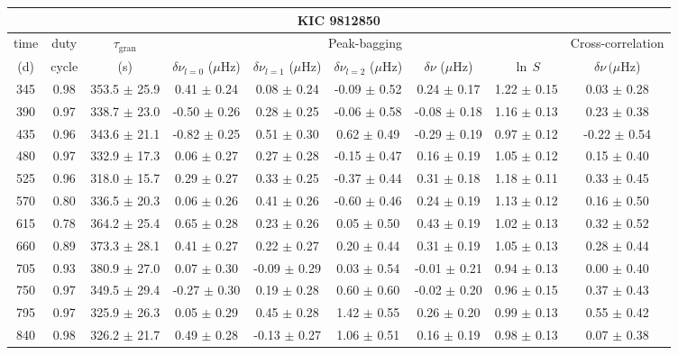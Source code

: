 \documentclass[twocolumn]{aastex61}%
\begin{document}
\begin{table*}[ht]\centering\fontsize{9.}{7.}\selectfont
\begin{tabular}{ccc|ccccc|c}
\multicolumn{9}{c}{KIC 9812850}\\ \hline\hline
time & duty & $\tau_\text{gran}$ &\multicolumn{5}{c|}{Peak-bagging}&Cross-correlation\\
(d)& cycle & (s)&$\delta\nu_{l=0}$ ($\mu$Hz) & $\delta\nu_{l=1}$ ($\mu$Hz) & $\delta\nu_{l=2}$ ($\mu$Hz) & $\delta\nu$ ($\mu$Hz)& $\ln\,S$ & $\delta\nu\,(\mu$Hz)\\\hline
345 & 0.98 & 353.5 $\pm$ 25.9 & 0.41 $\pm$ 0.24 & 0.08 $\pm$ 0.24 & -0.09 $\pm$ 0.52 & 0.24 $\pm$ 0.17 & 1.22 $\pm$ 0.15 & 0.03 $\pm$ 0.28\\
390 & 0.97 & 338.7 $\pm$ 23.0 & -0.50 $\pm$ 0.26 & 0.28 $\pm$ 0.25 & -0.06 $\pm$ 0.58 & -0.08 $\pm$ 0.18 & 1.16 $\pm$ 0.13 & 0.23 $\pm$ 0.38\\
435 & 0.96 & 343.6 $\pm$ 21.1 & -0.82 $\pm$ 0.25 & 0.51 $\pm$ 0.30 & 0.62 $\pm$ 0.49 & -0.29 $\pm$ 0.19 & 0.97 $\pm$ 0.12 & -0.22 $\pm$ 0.54\\
480 & 0.97 & 332.9 $\pm$ 17.3 & 0.06 $\pm$ 0.27 & 0.27 $\pm$ 0.28 & -0.15 $\pm$ 0.47 & 0.16 $\pm$ 0.19 & 1.05 $\pm$ 0.12 & 0.15 $\pm$ 0.40\\
525 & 0.96 & 318.0 $\pm$ 15.7 & 0.29 $\pm$ 0.27 & 0.33 $\pm$ 0.25 & -0.37 $\pm$ 0.44 & 0.31 $\pm$ 0.18 & 1.18 $\pm$ 0.11 & 0.33 $\pm$ 0.45\\
570 & 0.80 & 336.5 $\pm$ 20.3 & 0.06 $\pm$ 0.26 & 0.41 $\pm$ 0.26 & -0.60 $\pm$ 0.46 & 0.24 $\pm$ 0.19 & 1.13 $\pm$ 0.12 & 0.16 $\pm$ 0.50\\
615 & 0.78 & 364.2 $\pm$ 25.4 & 0.65 $\pm$ 0.28 & 0.23 $\pm$ 0.26 & 0.05 $\pm$ 0.50 & 0.43 $\pm$ 0.19 & 1.02 $\pm$ 0.13 & 0.32 $\pm$ 0.52\\
660 & 0.89 & 373.3 $\pm$ 28.1 & 0.41 $\pm$ 0.27 & 0.22 $\pm$ 0.27 & 0.20 $\pm$ 0.44 & 0.31 $\pm$ 0.19 & 1.05 $\pm$ 0.13 & 0.28 $\pm$ 0.44\\
705 & 0.93 & 380.9 $\pm$ 27.0 & 0.07 $\pm$ 0.30 & -0.09 $\pm$ 0.29 & 0.03 $\pm$ 0.54 & -0.01 $\pm$ 0.21 & 0.94 $\pm$ 0.13 & 0.00 $\pm$ 0.40\\
750 & 0.97 & 349.5 $\pm$ 29.4 & -0.27 $\pm$ 0.30 & 0.19 $\pm$ 0.28 & 0.60 $\pm$ 0.60 & -0.02 $\pm$ 0.20 & 0.96 $\pm$ 0.15 & 0.37 $\pm$ 0.43\\
795 & 0.97 & 325.9 $\pm$ 26.3 & 0.05 $\pm$ 0.29 & 0.45 $\pm$ 0.28 & 1.42 $\pm$ 0.55 & 0.26 $\pm$ 0.20 & 0.99 $\pm$ 0.13 & 0.55 $\pm$ 0.42\\
840 & 0.98 & 326.2 $\pm$ 21.7 & 0.49 $\pm$ 0.28 & -0.13 $\pm$ 0.27 & 1.06 $\pm$ 0.51 & 0.16 $\pm$ 0.19 & 0.98 $\pm$ 0.13 & 0.07 $\pm$ 0.38\\

\end{tabular}
\end{table*}
\end{document}
